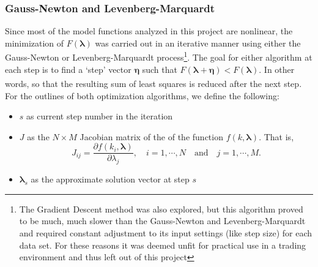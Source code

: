 \documentclass[12pt, a4paper, notitlepage]{article}
\numberwithin{equation}{subsection}
\numberwithin{figure}{subsection}
\numberwithin{table}{subsection}
\newcommand{\newpar}{\newline \newline}
\newcommand{\lambdaVect}{\pmb{\lambda}}
\begin{document}
\subsubsection{Gauss-Newton and Levenberg-Marquardt}\label{subsubsec:GNLM}

Since most of the model functions analyzed in this project are nonlinear, the minimization of $F(\lambdaVect)$ was carried out in an iterative manner using either the Gauss-Newton or Levenberg-Marquardt process\footnote{The Gradient Descent method was also explored, but this algorithm proved to be much, much slower than the Gauss-Newton and Levenberg-Marquardt and required constant adjustment to its input settings (like step size) for each data set.  For these reasons it was deemed unfit for practical use in a trading environment and thus left out of this project}.  The goal for either algorithm at each step is to find a `step' vector $\pmb{\eta}$ such that $F(\lambdaVect + \pmb{\eta}) < F(\lambdaVect)$.  In other words, so that the resulting sum of least squares is reduced after the next step\textsuperscript{\cite{Gavin}}.
\newpar
For the outlines of both optimization algorithms, we define the following:
\begin{itemize}
\item $s$ as current step number in the iteration 
\item $J$ as the $N \times M$ Jacobian matrix of the of the function $f(k,\lambdaVect)$.  That is, 
\begin{equation*}
	J_{ij} = \frac{\partial f(k_i,\lambdaVect)}{\partial \lambda_j}, \quad i = 1,\cdots, N \quad \text{and} \quad j = 1,\cdots, M.
\end{equation*}
\item $\lambdaVect_s$ as the approximate solution vector at step $s$
\end{itemize}
\end{document}
